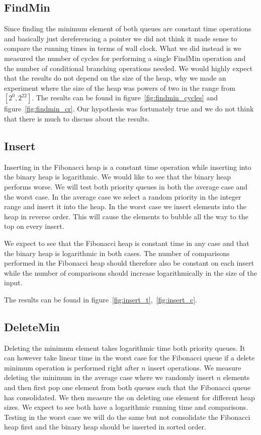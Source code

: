 \documentclass[a4paper,oneside,article,11pt]{memoir}
\begin{document}
\subsection{FindMin}
Since finding the minimum element of both queues are constant time operations and basically just dereferencing a pointer we did not think it made sense to compare the running times in terms of wall clock. What we did instead is we measured the number of cycles for performing a single FindMin operation and the number of conditional branching operations needed. We would highly expect that the results do not depend on the size of the heap, why we made an experiment where the size of the heap was powers of two in the range from $\left[2^0, 2^{22}\right]$. The results can be found in figure~\ref{fig:findmin_cycles} and figure~\ref{fig:findmin_cr}.
Our hypothesis was fortunately true and we do not think that there is much to discuss about the results.

\subsection{Insert}
Inserting in the Fibonacci heap is a constant time operation while inserting into the binary heap is logarithmic. We would like to see that the binary heap performs worse. We will test both priority queues in both the average case and the worst case. In the average case we select a random priority in the integer range and insert it into the heap.
In the worst case we insert elements into the heap in reverse order. This will cause the elements to bubble all the way to the top on every insert.

We expect to see that the Fibonacci heap is constant time in any case and that the binary heap is logarithmic in both cases. The number of comparisons performed in the Fibonacci heap should therefore also be constant on each insert while the number of comparisons should increase logarithmically in the size of the input.

The results can be found in figure~\ref{fig:insert_t},~\ref{fig:insert_c}.



\subsection{DeleteMin}
Deleting the minimum element takes logarithmic time both priority queues. It can however take linear time in the worst case for the Fibonacci queue if a delete minimum operation is performed right after $n$ insert operations. We measure deleting the minimum in the average case where we randomly insert $n$ elements and then first pop one element from both queues such that the Fibonacci queue has consolidated. We then measure the on deleting one element for different heap sizes. We expect to see both have a logarithmic running time and comparisons.
Testing in the worst case we will do the same but not consolidate the Fibonacci heap first and the binary heap should be inserted in sorted order.
\end{document}
